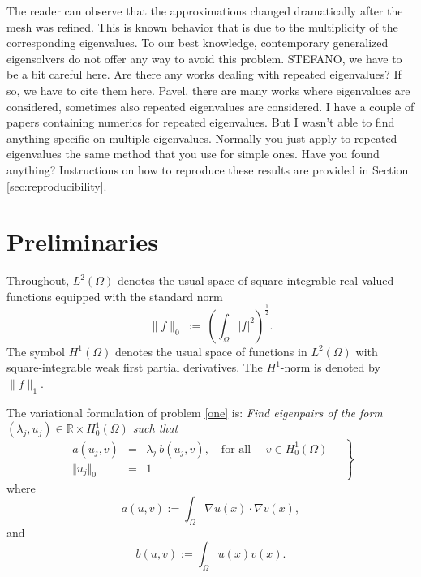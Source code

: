 \documentclass[preprint,12pt]{elsarticle}
\begin{document}
The reader can observe that the approximations changed dramatically after the 
mesh was refined. This is known behavior that is due to the multiplicity of the 
corresponding eigenvalues. To our best knowledge, contemporary generalized 
eigensolvers do not offer any way to avoid this problem. 
{\red STEFANO, we have to be a bit careful here. Are there any works dealing 
with repeated eigenvalues? If so, we have to cite them here.} {\red Pavel, there are many works where eigenvalues are considered, sometimes also repeated eigenvalues are considered. I have a couple of papers containing numerics for repeated eigenvalues. 
But I wasn't able to find anything specific on multiple eigenvalues. 
Normally you just apply to repeated eigenvalues the same method that you use for simple ones.
Have you found anything?}
Instructions on how to reproduce 
these results are provided in Section \ref{sec:reproducibility}.


\section{Preliminaries}\label{sec:preli}

Throughout, $L^2(\Omega)$
denotes the usual space of square-integrable real valued functions
equipped with the standard norm
\begin{equation}\label{eq:l2}
\|f\|_{0}\ := \ \left(\int_\Omega  |f|^2\right)^{\frac{1}{2}} .
\end{equation}
The symbol $H^1(\Omega)$ denotes the usual space of functions in $L^2(\Omega)$
with square-integrable weak first partial derivatives. The $H^1$-norm is 
denoted by $\|f\|_1$.

The variational formulation of problem \eqref{one} is:
\emph{Find eigenpairs of the form $(\lambda_j,u_j)\in
\mathbb{R}\times H^1_0(\Omega)$
such that}
\begin{equation}
\label{eq:var_prob}
\left.
\begin{array}{lcl}
a(u_j,v)&=& \lambda_j\ b(u_j,v),
\quad \text{for all } \quad v  \in H^1_0(\Omega)\\
 \Vert u_j \Vert_{0} &=& 1
\end{array}\quad
\right\}
\end{equation}
where
\begin{equation}\label{eq:a}
a(u,v):=\int_\Omega \nabla u(x)\cdot \nabla v(x),
\end{equation}
and
\begin{equation}\label{eq:b}
b(u,v):=\int_\Omega u(x) v(x).
\end{equation}
\end{document}
